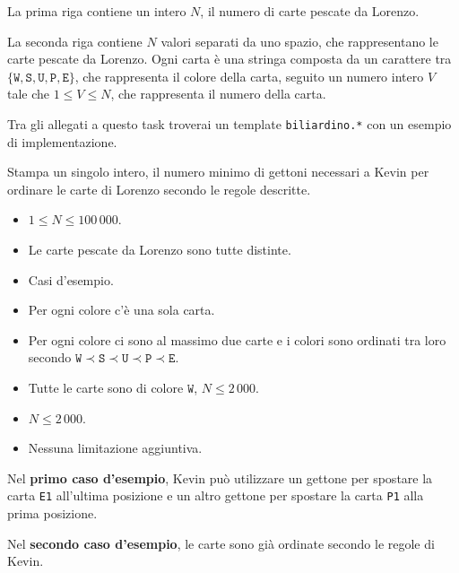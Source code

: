 \InputFile
La prima riga contiene un intero $N$, il numero di carte pescate da Lorenzo.

La seconda riga contiene $N$ valori separati da uno spazio, che rappresentano le carte pescate da Lorenzo.
Ogni carta è una stringa composta da un carattere tra $\{\texttt{W}, \texttt{S}, \texttt{U}, \texttt{P}, \texttt{E}\}$,
che rappresenta il colore della carta, seguito un numero intero $V$ tale che $1 \le V \le N$, che rappresenta il numero della carta.

\medskip

\begin{warning}
    Tra gli allegati a questo task troverai un template \texttt{biliardino.*} con un esempio di implementazione.
\end{warning}

\OutputFile
Stampa un singolo intero, il numero minimo di gettoni necessari a Kevin per ordinare le carte di Lorenzo secondo le regole descritte.

\Constraints
\begin{itemize}
    \item $1 \le N \le 100\,000$.
    \item Le carte pescate da Lorenzo sono tutte distinte.
\end{itemize}

\Scoring
\begin{itemize}
  \item \subtask Casi d'esempio.
  \item \subtask Per ogni colore c'è una sola carta.
  \item \subtask Per ogni colore ci sono al massimo due carte e i colori sono ordinati tra loro secondo 
    $\texttt{W} \prec \texttt{S} \prec \texttt{U} \prec \texttt{P} \prec \texttt{E}$.
  \item \subtask Tutte le carte sono di colore $\texttt{W}$, $N \le 2\,000$. 
  \item \subtask $N \le 2\,000$.
  \item \subtask Nessuna limitazione aggiuntiva.
\end{itemize}

\Examples

\begin{example}
\end{example}

\Explanations

Nel \textbf{primo caso d'esempio}, Kevin può utilizzare un gettone per spostare la carta \texttt{E1} all'ultima posizione e 
un altro gettone per spostare la carta \texttt{P1} alla prima posizione.

Nel \textbf{secondo caso d'esempio}, le carte sono già ordinate secondo le regole di Kevin.